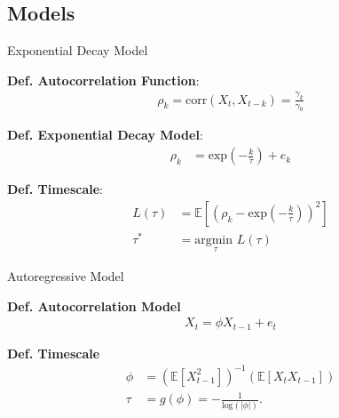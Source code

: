 \documentclass[12pt]{beamer}
\begin{document}
\subsection{Models}
\begin{frame}{Exponential Decay Model}
\scriptsize

\textbf{Def. Autocorrelation Function}:
\begin{align}
    \rho_k = \text{corr}(X_t, X_{t-k}) = \frac{\gamma_k}{\gamma_0}
\end{align}

\textbf{Def. Exponential Decay Model}:
\begin{align} \label{eq:acf}
\rho_k &= \text{exp}(-\frac{k}{\tau}) + e_k
\end{align}

\textbf{Def. Timescale}: 
\begin{align}
    L(\tau) &= \mathbb{E}[(\rho_k - \text{exp}(-\frac{k}{\tau}))^2]\\
    \tau^* &= \underset{\tau}{\text{argmin }} L(\tau)
\end{align}

\end{frame}

\begin{frame}{Autoregressive Model}
\scriptsize

\textbf{Def. Autocorrelation Model}
\begin{align}
    X_t = \phi X_{t-1} + e_t
\end{align}

\textbf{Def. Timescale}
\begin{align}
    \phi &= (\mathbb{E}[X_{t-1}^2])^{-1}(\mathbb{E}[X_t X_{t-1}])\\
    \tau &= g(\phi) = -\frac{1}{\text{log}(|\phi|)}. \label{eq:ar1-tau}
\end{align}
\end{frame}

\end{document}
